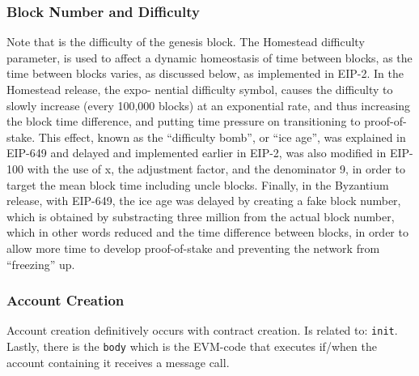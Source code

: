 \documentclass[10pt,letterpaper,leqno,bibliography=totoc]{scrartcl}
\newenvironment{alphafootnotes}
{\par\edef\savedfootnotenumber{\number\value{footnote}}
\renewcommand{\thefootnote}{\alph{footnote}}
\setcounter{footnote}{0}}
{\par\setcounter{footnote}{\savedfootnotenumber}}
\begin{document}
\begin{alphafootnotes}
\begin{multicols*}{2}
					\subsubsection{Block Number and Difficulty}
						Note that is the difficulty of the genesis block. The Homestead difficulty parameter, is used to affect a dynamic homeostasis of time between blocks, as the time between blocks varies, as discussed below, as implemented in EIP-2. In the Homestead release, the expo- nential difficulty symbol, causes the difficulty to slowly increase (every 100,000 blocks) at an exponential rate, and thus increasing the block time difference, and putting time pressure on transitioning to proof-of-stake. This effect, known as the “difficulty bomb”, or “ice age”, was explained in EIP-649 and delayed and implemented earlier in EIP-2, was also modified in EIP-100 with the use of x, the adjustment factor, and the denominator 9, in order to target the mean block time including uncle blocks. Finally, in the Byzantium release, with EIP-649, the ice age was delayed by creating a fake block number, which is obtained by substracting three million from the actual block number, which in other words reduced and the time difference between blocks, in order to allow more time to develop proof-of-stake and preventing the network from “freezing” up.\supercite{Wood2017}
					
					\subsubsection{Account Creation} 

					Account creation definitively occurs with contract creation. Is related to: \texttt{init}. Lastly, there is the \texttt{body} which is the EVM-code that executes if/when the account containing it receives a message call.


\end{multicols*}
\end{alphafootnotes}
\end{document}
